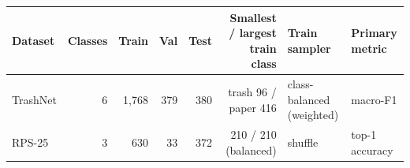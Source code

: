 \begin{tabular}{@{}lrrrrrll@{}}
\toprule
Dataset & Classes & Train & Val & Test & Smallest / largest train class & Train sampler & Primary metric \\
\midrule
TrashNet & 6 & 1{,}768 & 379 & 380 & trash 96 / paper 416 & class-balanced (weighted) & macro-F1 \\
RPS-25 & 3 & 630 & 33 & 372 & 210 / 210 (balanced) & shuffle & top-1 accuracy \\
\bottomrule
\end{tabular}

